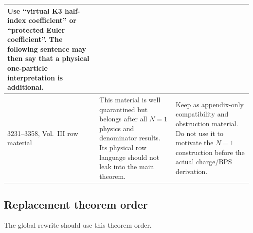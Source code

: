 \begin{center}
\begin{tabular}{p{}|p{}|p{}}
Use ``virtual K3 half-index coefficient'' or ``protected Euler
coefficient''.  The following sentence may then say that a physical
one-particle interpretation is additional.\\ \hline
3231--3358, Vol.~III row material&
This material is well quarantined but belongs after all \(N=1\) physics
and denominator results.  Its physical row language should not leak into
the main theorem.&
Keep as appendix-only compatibility and obstruction material.  Do not
use it to motivate the \(N=1\) construction before the actual
charge/BPS derivation.
\end{tabular}
\end{center}

\subsection{Replacement theorem order}

The global rewrite should use this theorem order.

